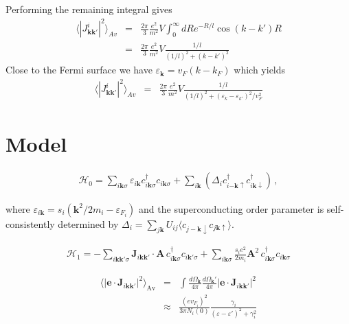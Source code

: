 \documentclass[aps,prb,reprint,noeprint,superscriptaddress]{revtex4-1}
\begin{document}
Performing the remaining integral gives 
\begin{eqnarray*}
	\langle 
	\left|J^i_{\mathbf{k}\mathbf{k}'}\right|^2 
	\rangle_{Av}
	&=& 
	\frac{2\pi}{3}\frac{e^2}{m^2} V
		\int_{0}^{\infty}dR
		e^{-R/l} \cos (k-k')R
	\\
	&=& 
	\frac{2\pi}{3}\frac{e^2}{m^2} V
	\frac{1/l}{(1/l)^2+ (k-k')^2}
\end{eqnarray*}
Close to the Fermi surface we have $\varepsilon_\mathbf{k}=v_F(k-k_F)$ which
yields
\begin{eqnarray*}
	\langle 
	\left|J^i_{\mathbf{k}\mathbf{k}'}\right|^2 
	\rangle_{Av}
	&=& 
	\frac{2\pi}{3}\frac{e^2}{m^2} V
	\frac{1/l}{(1/l)^2+ (\varepsilon_k-\varepsilon_{k'})^2/v_F^2}
\end{eqnarray*}

\section{Model}

\label{apdx:model}
\begin{eqnarray}
  \mathcal{H}_0 = \sum_{i\mathbf{k}\sigma}  
	\varepsilon_{i\mathbf{k}}c_{i\mathbf{k}\sigma}^\dagger
	c_{i\mathbf{k}\sigma} + \sum_{i\mathbf{k}}^{}
	\left( \Delta_i c_{i\mathbf{-k}\uparrow }^\dagger
	c_{i\mathbf{k}\downarrow }^\dagger  \right) \,,
\end{eqnarray}

where $\varepsilon_{i\mathbf{k}} = s_i \left(\mathbf{k}^2/2m_i -
\varepsilon_{F_i}\right)$ and the superconducting order parameter is self-consistently determined by 
$\Delta_i = \sum_{j\mathbf{k}}^{}U_{ij} \langle c_{j-\mathbf{k}\downarrow
}c_{j\mathbf{k}\uparrow }\rangle$.

\begin{eqnarray*}
	\mathcal{H}_1 = -\sum_{i\mathbf{kk'}\sigma}^{}
	\mathbf{J}_{i\mathbf{kk'}} \cdot \mathbf{A} \,
	c_{i\mathbf{k}\sigma}^\dagger  c_{i\mathbf{k}'\sigma} +
	\sum_{i\mathbf{k}\sigma}^{} \frac{s_i e^2}{2m_i} \mathbf{A}^2 \,
	c_{i\mathbf{k}\sigma}^\dagger c_{i\mathbf{k}\sigma}
\end{eqnarray*}

\begin{eqnarray*}
	\langle \left|\mathbf{e} \cdot
	\mathbf{J}_{i\mathbf{kk'}}\right|^2\rangle_{\text{Av}}
	&=& \int \frac{d\Omega_\mathbf{k}}{4\pi} \frac{d\Omega_\mathbf{k}'}{4\pi}
	\left|\mathbf{e} \cdot \mathbf{J}_{i\mathbf{kk'}}\right|^2
	\\
	&\approx& \frac{(e v_{F_i})^2}{3 \pi N_i(0)} 
	\frac{\gamma_i}{(\varepsilon-\varepsilon')^2 + \gamma_i^2}
\end{eqnarray*}
\end{document}
